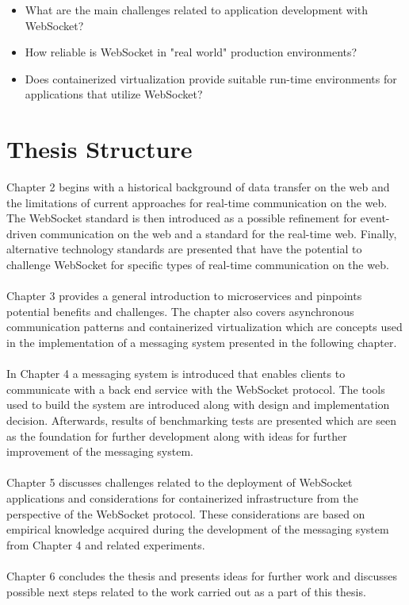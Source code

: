 \begin{itemize}
\item What are the main challenges related to application development with WebSocket?
\item How reliable is WebSocket in "real world" production environments?
\item Does containerized virtualization provide suitable run-time environments for applications that utilize WebSocket?
\end{itemize}

\section{Thesis Structure}

Chapter 2 begins with a historical background of data transfer on the web and the limitations of current approaches for real-time communication on the web. The WebSocket standard is then introduced as a possible refinement for event-driven communication on the web and a standard for the real-time web. Finally, alternative technology standards are presented that have the potential to challenge WebSocket for specific types of real-time communication on the web.
\\ \\
Chapter 3 provides a general introduction to microservices and pinpoints potential benefits and challenges. The chapter also covers asynchronous communication patterns and containerized virtualization which are concepts used in the implementation of a messaging system presented in the following chapter.
\\ \\
In Chapter 4 a messaging system is introduced that enables clients to communicate with a back end service with the WebSocket protocol. The tools used to build the system are introduced along with design and implementation decision. Afterwards, results of benchmarking tests are presented which are seen as the foundation for further development along with ideas for further improvement of the messaging system.
\\ \\
Chapter 5 discusses challenges related to the deployment of WebSocket applications and considerations for containerized infrastructure from the perspective of the WebSocket protocol. These considerations are based on empirical knowledge acquired during the development of the messaging system from Chapter 4 and related experiments.
\\ \\
Chapter 6 concludes the thesis and presents ideas for further work and discusses possible next steps related to the work carried out as a part of this thesis.